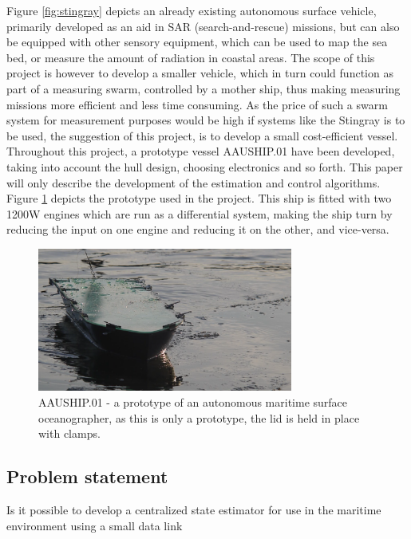 \documentclass{ifacconf}
\begin{document}
Figure \ref{fig:stingray} depicts an already existing autonomous surface vehicle, primarily developed as an aid in SAR (search-and-rescue) missions, but can also be equipped with other sensory equipment, which can be used to map the sea bed, or measure the amount of radiation in coastal areas. The scope of this project is however to develop a smaller vehicle, which in turn could function as part of a measuring swarm, controlled by a mother ship, thus making measuring missions more efficient and less time consuming. As the price of such a swarm system for measurement purposes would be high if systems like the Stingray is to be used, the suggestion of this project, is to develop a small cost-efficient vessel. Throughout this project, a prototype vessel AAUSHIP.01 have been developed, taking into account the hull design, choosing electronics and so forth. This paper will only describe the development of the estimation and control algorithms. Figure \ref{fig:ship} depicts the prototype used in the project. This ship is fitted with two 1200W engines which are run as a differential system, making the ship turn by reducing the input on one engine and reducing it on the other, and vice-versa. 

\begin{figure}
	\begin{center}
		\includegraphics[width=8.4cm]{img/aauship.png} %
		\caption{AAUSHIP.01 - a prototype of an autonomous maritime surface oceanographer, as this is only a prototype, the lid is held in place with clamps. }  
		\label{fig:ship}
	\end{center}
\end{figure}

\subsection{Problem statement}
\begin{hypo} Is it possible to develop a centralized state estimator for use in the maritime environment using a small data link \end{hypo}
\end{document}
